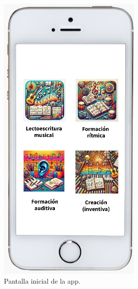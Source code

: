 \documentclass[spanish]{textolivre}
\begin{document}
\noindent
\begin{minipage}[b]{0.30\textwidth}
    \begin{figure}[H]
        \centering
        \includegraphics[width=\linewidth]{Fig1.png}
        \caption{Pantalla inicial de la app.}
    \end{figure}
\end{minipage}
\end{document}
